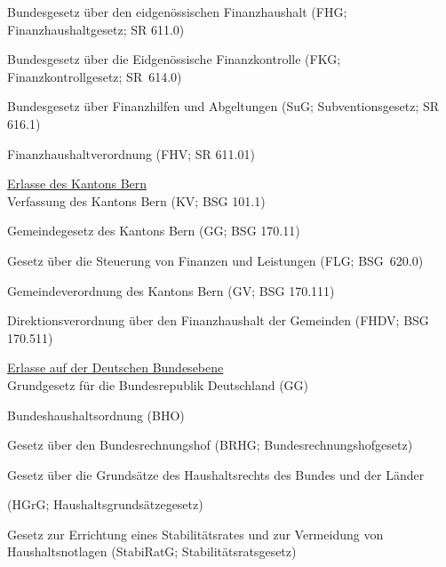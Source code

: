 \documentclass[10pt]{article}
\begin{document}
Bundesgesetz über den eidgenössischen Finanzhaushalt (FHG; Finanzhaushaltgesetz; SR 611.0)

Bundesgesetz über die Eidgenössische Finanzkontrolle (FKG; Finanzkontrollgesetz; SR~614.0)

Bundesgesetz über Finanzhilfen und Abgeltungen (SuG; Subventionsgesetz; SR 616.1)

Finanzhaushaltverordnung (FHV; SR 611.01)

\vspace{0.2cm}
\underline{Erlasse des Kantons Bern}\\
Verfassung des Kantons Bern (KV; BSG 101.1)

Gemeindegesetz des Kantons Bern (GG; BSG 170.11)

Gesetz über die Steuerung von Finanzen und Leistungen (FLG; BSG~620.0)

Gemeindeverordnung des Kantons Bern (GV; BSG 170.111)

Direktionsverordnung über den Finanzhaushalt der Gemeinden (FHDV; BSG 170.511)

\vspace{0.2cm}
\underline{Erlasse auf der Deutschen Bundesebene}\\
Grundgesetz für die Bundesrepublik Deutschland (GG)

Bundeshaushaltsordnung (BHO)

Gesetz über den Bundesrechnungshof (BRHG; Bundesrechnungshofgesetz)

Gesetz über die Grundsätze des Haushaltsrechts des Bundes und der Länder

(HGrG; Haushaltsgrundsätzegesetz)

Gesetz zur Errichtung eines Stabilitätsrates und zur Vermeidung von Haushaltsnotlagen (StabiRatG; Stabilitätsratsgesetz)
\end{document}
